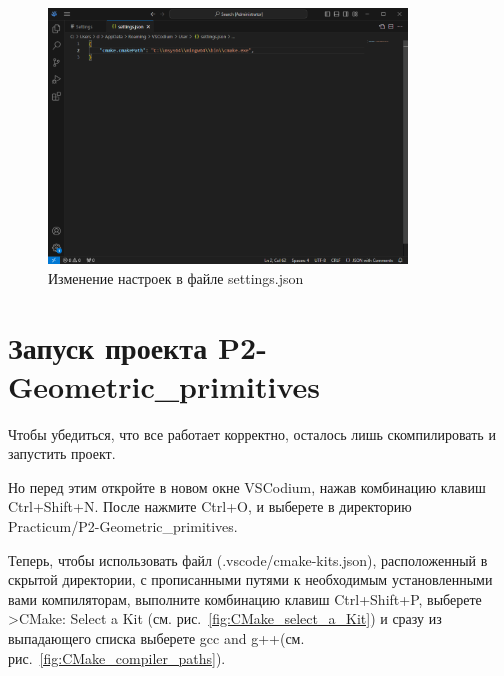 \documentclass[a4paper,12pt]{article}
\begin{document}
        \begin{figure}[H]
            \centering
			\includegraphics[width=0.85\textwidth]{images/Settings_of_json_file.png}
			\caption {Изменение настроек в файле \textquotedbl settings.json\textquotedbl}
            \label{fig:Settings_of_json_file}
        \end{figure}
        
        
        
        \section{ Запуск проекта \textquotedbl P2-Geometric\_primitives\textquotedbl }
        
        Чтобы убедиться, что все работает корректно, осталось лишь скомпилировать и запустить проект.

        Но перед этим откройте в новом окне VSCodium, нажав комбинацию клавиш Ctrl+Shift+N. После нажмите Ctrl+O, и выберете в директорию \\ Practicum/P2-Geometric\_primitives.
        
        Теперь, чтобы использовать файл (.vscode/cmake-kits.json), расположенный в скрытой директории, с прописанными путями к необходимым установленными вами компиляторам,
        выполните комбинацию клавиш Ctrl+Shift+P, выберете
        \textquotedbl >CMake: Select a Kit\textquotedbl
        (см. рис.~\ref{fig:CMake_select_a_Kit}) и сразу из выпадающего списка выберете \textquotedbl gcc and g++\textquotedbl (см. рис.~\ref{fig:CMake_compiler_paths}).
        
        
        
\end{document}

